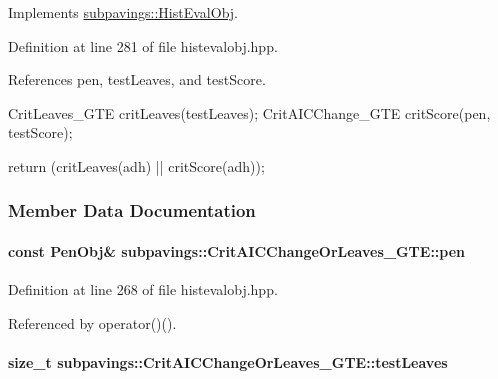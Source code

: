 \-Implements \hyperlink{classsubpavings_1_1HistEvalObj_a56a8d23818446775d7e4ef24755425e9}{subpavings\-::\-Hist\-Eval\-Obj}.



\-Definition at line 281 of file histevalobj.\-hpp.



\-References pen, test\-Leaves, and test\-Score.


\begin{DoxyCode}
    {
        CritLeaves_GTE critLeaves(testLeaves);
        CritAICChange_GTE critScore(pen, testScore);

        return (critLeaves(adh) || critScore(adh));
    }
\end{DoxyCode}


\subsubsection{\-Member \-Data \-Documentation}
\hypertarget{classsubpavings_1_1CritAICChangeOrLeaves__GTE_a920999ec1b5f624dec19bf8a504a8253}{
\paragraph[{pen}]{\setlength{\rightskip}{0pt plus 5cm}const {\bf \-Pen\-Obj}\& {\bf subpavings\-::\-Crit\-A\-I\-C\-Change\-Or\-Leaves\-\_\-\-G\-T\-E\-::pen}}}\label{classsubpavings_1_1CritAICChangeOrLeaves__GTE_a920999ec1b5f624dec19bf8a504a8253}


\-Definition at line 268 of file histevalobj.\-hpp.



\-Referenced by operator()().

\hypertarget{classsubpavings_1_1CritAICChangeOrLeaves__GTE_ad8960d95c624326914fb57574c3ecd6d}{
\paragraph[{test\-Leaves}]{\setlength{\rightskip}{0pt plus 5cm}size\-\_\-t {\bf subpavings\-::\-Crit\-A\-I\-C\-Change\-Or\-Leaves\-\_\-\-G\-T\-E\-::test\-Leaves}}}\label{classsubpavings_1_1CritAICChangeOrLeaves__GTE_ad8960d95c624326914fb57574c3ecd6d}


